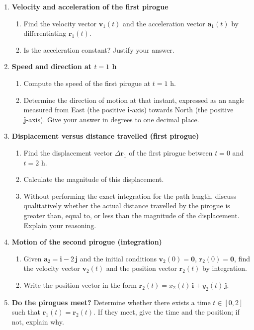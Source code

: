 \documentclass[11pt]{article}
\begin{document}
\begin{enumerate}
    \item \textbf{Velocity and acceleration of the first pirogue}
    \begin{enumerate}
        \item Find the velocity vector $\mathbf{v}_1(t)$ and the acceleration vector $\mathbf{a}_1(t)$ by differentiating $\mathbf{r}_1(t)$.
        \item Is the acceleration constant? Justify your answer.
    \end{enumerate}

    \item \textbf{Speed and direction at $t=1$ h}
    \begin{enumerate}
        \item Compute the speed of the first pirogue at $t=1$ h.
        \item Determine the direction of motion at that instant, expressed as an angle measured from East (the positive \textbf{i}‑axis) towards North (the positive \textbf{j}‑axis). Give your answer in degrees to one decimal place.
    \end{enumerate}

    \item \textbf{Displacement versus distance travelled (first pirogue)}
    \begin{enumerate}
        \item Find the displacement vector $\Delta\mathbf{r}_1$ of the first pirogue between $t=0$ and $t=2$ h.
        \item Calculate the magnitude of this displacement.
        \item Without performing the exact integration for the path length, discuss qualitatively whether the actual distance travelled by the pirogue is greater than, equal to, or less than the magnitude of the displacement. Explain your reasoning.
    \end{enumerate}

    \item \textbf{Motion of the second pirogue (integration)}
    \begin{enumerate}
        \item Given $\mathbf{a}_2 = \mathbf{i} - 2\,\mathbf{j}$ and the initial conditions $\mathbf{v}_2(0)=\mathbf{0}$, $\mathbf{r}_2(0)=\mathbf{0}$, find the velocity vector $\mathbf{v}_2(t)$ and the position vector $\mathbf{r}_2(t)$ by integration.
        \item Write the position vector in the form $\mathbf{r}_2(t) = x_2(t)\,\mathbf{i} + y_2(t)\,\mathbf{j}$.
    \end{enumerate}

    \item \textbf{Do the pirogues meet?}
    Determine whether there exists a time $t \in [0,2]$ such that $\mathbf{r}_1(t) = \mathbf{r}_2(t)$. If they meet, give the time and the position; if not, explain why.
\end{enumerate}
\end{document}
